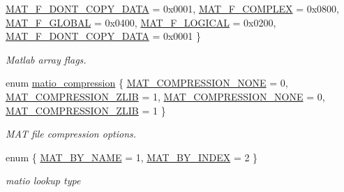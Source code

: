 \begin{DoxyCompactItemize}
\hyperlink{group___m_a_t_ggab9d6ef9e3ddca78a317b173f01d53fbba762244499f52eb35e7b53fb79a1f2889}{M\+A\+T\+\_\+\+F\+\_\+\+D\+O\+N\+T\+\_\+\+C\+O\+P\+Y\+\_\+\+D\+A\+TA} = 0x0001, 
\newline
\hyperlink{group___m_a_t_ggab9d6ef9e3ddca78a317b173f01d53fbbacd7b091a11184aad7fc6078c04470780}{M\+A\+T\+\_\+\+F\+\_\+\+C\+O\+M\+P\+L\+EX} = 0x0800, 
\hyperlink{group___m_a_t_ggab9d6ef9e3ddca78a317b173f01d53fbba49084e0c796aa7963e53f7539525d40d}{M\+A\+T\+\_\+\+F\+\_\+\+G\+L\+O\+B\+AL} = 0x0400, 
\hyperlink{group___m_a_t_ggab9d6ef9e3ddca78a317b173f01d53fbba57eb5c6e200bcbc0f1b7982f29a169c2}{M\+A\+T\+\_\+\+F\+\_\+\+L\+O\+G\+I\+C\+AL} = 0x0200, 
\hyperlink{group___m_a_t_ggab9d6ef9e3ddca78a317b173f01d53fbba762244499f52eb35e7b53fb79a1f2889}{M\+A\+T\+\_\+\+F\+\_\+\+D\+O\+N\+T\+\_\+\+C\+O\+P\+Y\+\_\+\+D\+A\+TA} = 0x0001
 \}\begin{DoxyCompactList}\small\item\em Matlab array flags. \end{DoxyCompactList}
\item 
enum \hyperlink{group___m_a_t_ga768c318af97bd2567758ecb001ceb7f4}{matio\+\_\+compression} \{ \hyperlink{group___m_a_t_gga768c318af97bd2567758ecb001ceb7f4a2280b97631ff5dd24dec55261dc587b6}{M\+A\+T\+\_\+\+C\+O\+M\+P\+R\+E\+S\+S\+I\+O\+N\+\_\+\+N\+O\+NE} = 0, 
\hyperlink{group___m_a_t_gga768c318af97bd2567758ecb001ceb7f4a5181d2f71eab0f12f05ba65d4f13fb53}{M\+A\+T\+\_\+\+C\+O\+M\+P\+R\+E\+S\+S\+I\+O\+N\+\_\+\+Z\+L\+IB} = 1, 
\hyperlink{group___m_a_t_gga768c318af97bd2567758ecb001ceb7f4a2280b97631ff5dd24dec55261dc587b6}{M\+A\+T\+\_\+\+C\+O\+M\+P\+R\+E\+S\+S\+I\+O\+N\+\_\+\+N\+O\+NE} = 0, 
\hyperlink{group___m_a_t_gga768c318af97bd2567758ecb001ceb7f4a5181d2f71eab0f12f05ba65d4f13fb53}{M\+A\+T\+\_\+\+C\+O\+M\+P\+R\+E\+S\+S\+I\+O\+N\+\_\+\+Z\+L\+IB} = 1
 \}\begin{DoxyCompactList}\small\item\em M\+AT file compression options. \end{DoxyCompactList}
\item 
enum \{ \hyperlink{group___m_a_t_gga03158cf3a896ec3d4f306b5e920109b4a26c82f22528c705191141491a072db3e}{M\+A\+T\+\_\+\+B\+Y\+\_\+\+N\+A\+ME} = 1, 
\hyperlink{group___m_a_t_gga03158cf3a896ec3d4f306b5e920109b4a69c57994e272a363f56cb3ba888b047e}{M\+A\+T\+\_\+\+B\+Y\+\_\+\+I\+N\+D\+EX} = 2
 \}\begin{DoxyCompactList}\small\item\em matio lookup type \end{DoxyCompactList}
\item 

\end{DoxyCompactItemize}
